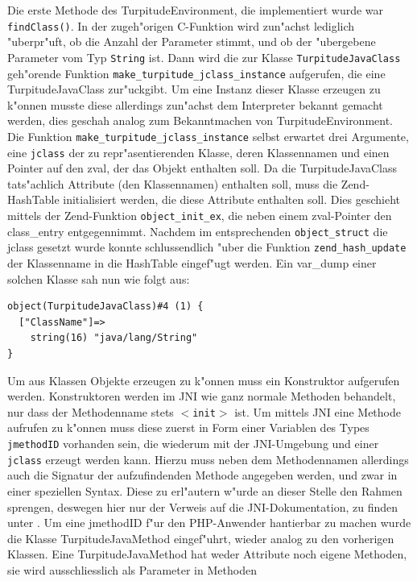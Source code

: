 Die erste Methode des TurpitudeEnvironment, die implementiert wurde war \texttt{findClass()}. In der zugeh"origen C-Funktion wird zun"achst 
lediglich "uberpr"uft, ob die Anzahl der Parameter stimmt, und ob der "ubergebene Parameter vom Typ \texttt{String} ist. Dann wird die
zur Klasse \texttt{TurpitudeJavaClass} geh"orende Funktion \texttt{make\_turpitude\_jclass\_instance} aufgerufen, die eine TurpitudeJavaClass
zur"uckgibt. Um eine Instanz dieser
Klasse erzeugen zu k"onnen musste diese allerdings zun"achst dem Interpreter bekannt gemacht werden, dies geschah analog zum Bekanntmachen
von TurpitudeEnvironment. Die Funktion \texttt{make\_turpitude\_jclass\_instance} selbst erwartet drei Argumente, eine \texttt{jclass} der zu
repr"asentierenden Klasse, deren Klassennamen und einen Pointer auf den zval, der das Objekt enthalten soll. Da die TurpitudeJavaClass 
tats"achlich Attribute (den Klassennamen) enthalten soll, muss die Zend-HashTable initialisiert werden, die diese Attribute enthalten soll.
Dies geschieht mittels der Zend-Funktion \texttt{object\_init\_ex}, die neben einem zval-Pointer den class\_entry entgegennimmt.
Nachdem im entsprechenden \texttt{object\_struct} die jclass gesetzt wurde konnte schlussendlich "uber die Funktion \texttt{zend\_hash\_update} 
der Klassenname in die HashTable eingef"ugt werden. Ein var\_dump einer solchen Klasse sah nun wie folgt aus:
\begin{lstlisting}[caption=Dump einer TurpitudeJavaClass]
object(TurpitudeJavaClass)#4 (1) {
  ["ClassName"]=>
    string(16) "java/lang/String"
}
\end{lstlisting}
Um aus Klassen Objekte erzeugen zu k"onnen muss ein Konstruktor aufgerufen werden. Konstruktoren werden im JNI wie ganz normale Methoden
behandelt, nur dass der Methodenname stets \texttt{$<$init$>$} ist. Um mittels JNI eine Methode aufrufen zu k"onnen muss diese zuerst in
Form einer Variablen des Types \texttt{jmethodID} vorhanden sein, die wiederum mit der JNI-Umgebung und einer \texttt{jclass} erzeugt werden kann.
Hierzu muss neben dem Methodennamen allerdings auch die Signatur der aufzufindenden Methode angegeben werden, und zwar in einer speziellen
Syntax. Diese zu erl"autern w"urde an dieser Stelle den Rahmen sprengen, deswegen hier nur der Verweis auf die JNI-Dokumentation, zu finden
unter \cite{JNIHP}.
Um eine jmethodID f"ur den PHP-Anwender hantierbar zu machen wurde die Klasse TurpitudeJavaMethod eingef"uhrt, wieder analog zu den
vorherigen Klassen. Eine TurpitudeJavaMethod hat weder Attribute noch eigene Methoden, sie wird ausschliesslich als Parameter in Methoden
